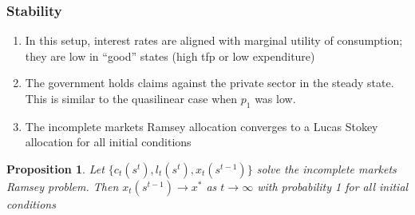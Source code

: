 \documentclass{beamer}
\newcommand{\EE}{\mathbb E}
\newtheorem{proposition}{Proposition}
\begin{document}
%
%
%
\begin{frame}
	\frametitle{Stability}
	\begin{enumerate}
	 \item In this setup, interest rates are aligned with marginal utility of consumption;  they are low  in ``good'' states (high tfp or low expenditure)
	 \item The government holds claims against the private sector in the steady state. This is similar to the quasilinear case when $p_1$ was low.	 
	 \item The incomplete markets Ramsey allocation converges to a Lucas Stokey allocation for all initial conditions	 	
	\end{enumerate}


	\begin{proposition}  Let $\{c_t(s^t), l_t(s^t), x_t(s^{t-1})\}$ solve the incomplete markets Ramsey problem.  Then  $x_t(s^{t-1})\rightarrow x^*$ as $t\rightarrow \infty$ with probability 1 for all initial conditions
	
	\end{proposition}
	\end{frame}
	
\end{document}
